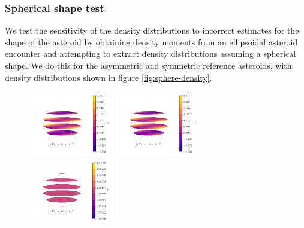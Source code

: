 \documentclass[fleqn,usenatbib]{mnras}
\begin{document}
\subsubsection{Spherical shape test}
We test the sensitivity of the density distributions to incorrect estimates for the shape of the asteroid by obtaining density moments from an ellipsoidal asteroid encounter and attempting to extract density distributions assuming a spherical shape. We do this for the asymmetric and symmetric reference asteroids, with density distributions shown in figure \ref{fig:sphere-density}.

\begin{figure}
  \centering
  \includegraphics[width=0.33\textwidth]{figs/asym-sph-likelihood.pdf}\hfill
  \includegraphics[width=0.33\textwidth]{figs/asym-sph-harmonic.pdf}\hfill
  \includegraphics[width=0.33\textwidth]{figs/asym-sph-lumpy.pdf}


\end{figure}
\end{document}
